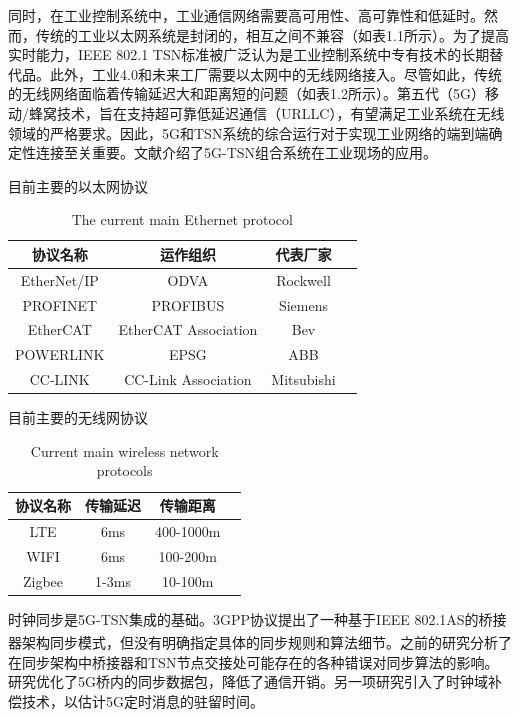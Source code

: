 \documentclass[UTF8,a4paper,12pt]{ctexart}
\numberwithin{equation}{section}
\begin{document}
	同时，在工业控制系统中，工业通信网络需要高可用性、高可靠性和低延时。然而，传统的工业以太网系统是封闭的，相互之间不兼容（如表1.1所示）。为了提高实时能力，IEEE 802.1 TSN标准被广泛认为是工业控制系统中专有技术的长期替代品。此外，工业4.0和未来工厂需要以太网中的无线网络接入。尽管如此，传统的无线网络面临着传输延迟大和距离短的问题（如表1.2所示）。第五代（5G）移动/蜂窝技术，旨在支持超可靠低延迟通信（URLLC），有望满足工业系统在无线领域的严格要求。因此，5G和TSN系统的综合运行对于实现工业网络的端到端确定性连接至关重要。文献\cite{zhang2022wireless}介绍了5G-TSN组合系统在工业现场的应用。
	\begin{table}[!htbp]
		\centering
		\caption{目前主要的以太网协议}
		\vspace{-10pt}
		\caption{The current main Ethernet protocol}
		
		\begin{tabular}{|c| c|c|c|}
			\hline
			\textbf{协议名称}& \textbf{运作组织}& \textbf{代表厂家} \\
			\hline
			EtherNet/IP
			& ODVA
			& Rockwell \\
			\hline
			PROFINET
			& PROFIBUS
			& Siemens \\
			\hline
			EtherCAT
			& EtherCAT Association
			& Bev \\
			\hline
			POWERLINK
			& EPSG
			& ABB \\
			\hline
			CC-LINK
			& CC-Link Association
			& Mitsubishi \\
			\hline
		\end{tabular}
	\end{table}
	\begin{table}[!htbp]
		\centering
		\caption{目前主要的无线网协议}
		\vspace{-10pt}
		\caption{Current main wireless network protocols}
		\begin{tabular}{|c| c|c|c|}
			\hline
			\textbf{协议名称}& \textbf{传输延迟}& \textbf{传输距离} \\
			\hline
			LTE
			& 6ms
			& 400-1000m \\
			\hline
			WIFI
			& 6ms
			& 100-200m \\
			\hline
			Zigbee
			& 1-3ms
			& 10-100m \\
			\hline
		\end{tabular}
	\end{table}
	时钟同步是5G-TSN集成的基础。3GPP协议提出了一种基于IEEE 802.1AS的桥接器架构同步模式，但没有明确指定具体的同步规则和算法细节\textsuperscript{\cite{888888}}。之前的研究\cite{9527833}分析了在同步架构中桥接器和TSN节点交接处可能存在的各种错误对同步算法的影响。研究\cite{9211936}优化了5G桥内的同步数据包，降低了通信开销。另一项研究\cite{9674640}引入了时钟域补偿技术，以估计5G定时消息的驻留时间。
	
\end{document}
